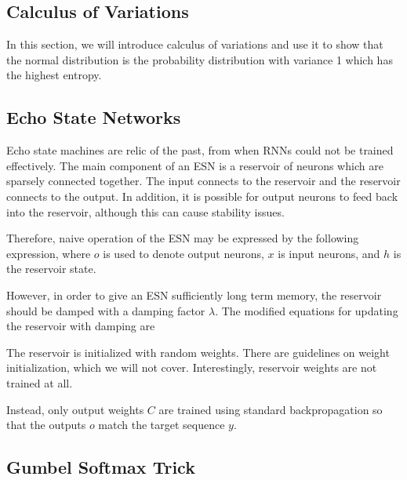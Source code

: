 \documentclass[12pt]{article}
\begin{document}

\subsection{Calculus of Variations}

In this section, we will introduce calculus of variations and use it to show that the normal distribution is the probability distribution with variance 1 which has the highest entropy.

\subsection{Echo State Networks}

Echo state machines are relic of the past, from when RNNs could not be trained effectively. The main component of an ESN is a reservoir of neurons which are sparsely connected together. The input connects to the reservoir and the reservoir connects to the output. In addition, it is possible for output neurons to feed back into the reservoir, although this can cause stability issues.

Therefore, naive operation of the ESN may be expressed by the following expression, where $o$ is used to denote output neurons, $x$ is input neurons, and $h$ is the reservoir state.


However, in order to give an ESN sufficiently long term memory, the reservoir should be damped with a damping factor $\lambda$. The modified equations for updating the reservoir with damping are


The reservoir is initialized with random weights. There are guidelines on weight initialization, which we will not cover. Interestingly, reservoir weights are not trained at all.

Instead, only output weights $C$ are trained using standard backpropagation so that the outputs $o$ match the target sequence $y$. 

\subsection{Gumbel Softmax Trick}
\end{document}

